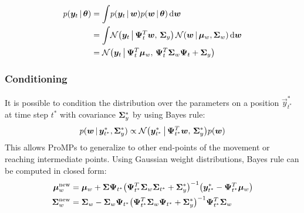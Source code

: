 			\begin{align*}
				p(\bm{y}_t \,\vert\, \bm{\theta})
					&= \int\! p(\bm{y}_t \,\vert\, \bm{w}) p(\bm{w} \,\vert\, \bm{\theta}) \dd{\bm{w}} \\
					&= \int\! \mathcal{N}\big( \bm{y}_t \,\big\vert\, \bm{\Psi}_t^T \bm{w},\, \bm{\Sigma}_y \big) \, \mathcal{N}(\bm{w} \,\vert\, \bm{\mu}_w, \bm{\Sigma}_w) \dd{\bm{w}} \\
					&= \mathcal{N}\big( \bm{y}_t \,\big\vert\, \bm{\Psi}_t^T \bm{\mu}_w,\, \bm{\Psi}_t^T \bm{\Sigma}_w \bm{\Psi}_t + \bm{\Sigma}_y \big)
			\end{align*}

			\subsubsection{Conditioning}
				It is possible to condition the distribution over the parameters on a position \( \vec{y}_{t^\ast}^\ast \) at time step \(t^\ast\) with covariance \( \bm{\Sigma}_y^\ast \) by using Bayes rule:
				\begin{equation*}
					p(\bm{w} \,\vert\, \bm{y}_{t^\ast}^\ast, \bm{\Sigma}_y^\ast) \propto \mathcal{N}\big( \bm{y}_{t^\ast}^\ast \,\big\vert\, \bm{\Psi}_{t^\ast}^T \bm{w},\, \bm{\Sigma}_y^\ast \big) p(\bm{w})
				\end{equation*}
				This allows ProMPs to generalize to other end-points of the movement or reaching intermediate points. Using Gaussian weight distributions, Bayes rule can be computed in closed form:
				\begin{align*}
					\bm{\mu}_w^\mathrm{new} &= \bm{\mu}_w + \bm{\Sigma} \bm{\Psi}_{t^\ast} \big( \bm{\Psi}_{t^\ast}^T \bm{\Sigma}_w \bm{\Sigma}_{t^\ast} + \bm{\Sigma}_y^\ast \big)^{-1} \big( \bm{y}_{t^\ast}^\ast - \bm{\Psi}_{t^\ast}^T \bm{\mu}_w \big) \\
					\bm{\Sigma}_w^\mathrm{new} &= \bm{\Sigma}_w - \bm{\Sigma}_w \bm{\Psi}_{t^\ast} \big( \bm{\Psi}_{t^\ast}^T \bm{\Sigma}_w \bm{\Psi}_{t^\ast} + \bm{\Sigma}_y^\ast \big)^{-1} \bm{\Psi}_{t^\ast}^T \bm{\Sigma}_w
				\end{align*}

